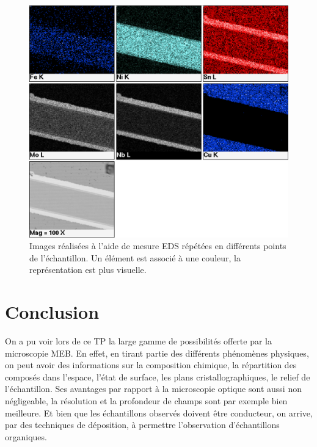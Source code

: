 \documentclass[a4paper,12pt]{article}
\begin{document}
\begin{figure}
\centering
\includegraphics[width=\textwidth]{images/im5.png}
\caption{Images réalisées à l'aide de mesure EDS répétées en différents points de l'échantillon. Un élément est associé à une couleur, la représentation est plus visuelle.}
\label{fig:eds}
\end{figure}





\section*{Conclusion}


On a pu voir lors de ce TP la large gamme de possibilités offerte par la microscopie MEB. En effet, en tirant partie des différents phénomènes physiques, on peut avoir des informations sur la composition chimique, la répartition des composés dans l'espace, l'état de surface, les plans cristallographiques, le relief de l'échantillon. Ses avantages par rapport à la microscopie optique sont aussi non négligeable, la résolution et la profondeur de champs sont par exemple bien meilleure. Et bien que les échantillons observés doivent être conducteur, on arrive, par des techniques de déposition, à permettre l'observation d'échantillons organiques.
\end{document}
